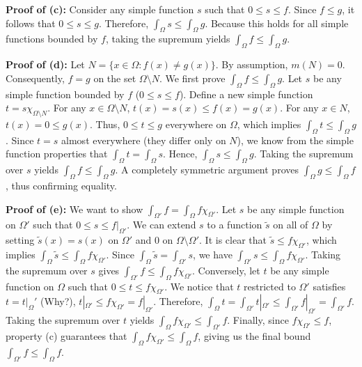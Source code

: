 \begin{pfbox}
    \textbf{Proof of (c):} Consider any simple function $s$ such that $0 \le s \le f$. Since $f \le g$, it follows that $0 \le s \le g$. Therefore, $\int_\Omega s \le \int_\Omega g$. Because this holds for all simple functions bounded by $f$, taking the supremum yields $\int_\Omega f \le \int_\Omega g$.

    \textbf{Proof of (d):} Let $N = \{x \in \Omega : f(x) \neq g(x)\}$. By assumption, $m(N) = 0$. Consequently, $f = g$ on the set $\Omega \setminus N$.
    We first prove $\int_\Omega f \le \int_\Omega g$. Let $s$ be any simple function bounded by $f$ ($0 \le s \le f$). Define a new simple function $t = s \chi_{\Omega \setminus N}$.
    For any $x \in \Omega \setminus N$, $t(x) = s(x) \le f(x) = g(x)$. For any $x \in N$, $t(x) = 0 \le g(x)$.
    Thus, $0 \le t \le g$ everywhere on $\Omega$, which implies $\int_\Omega t \le \int_\Omega g$. Since $t = s$ almost everywhere (they differ only on $N$), we know from the simple function properties that $\int_\Omega t = \int_\Omega s$. Hence, $\int_\Omega s \le \int_\Omega g$. Taking the supremum over $s$ yields $\int_\Omega f \le \int_\Omega g$.
    A completely symmetric argument proves $\int_\Omega g \le \int_\Omega f$, thus confirming equality.

    \textbf{Proof of (e):} We want to show $\int_{\Omega'} f = \int_\Omega f \chi_{\Omega'}$. Let $s$ be any simple function on $\Omega'$ such that $0 \le s \le f|_{\Omega'}$. We can extend $s$ to a function $\tilde{s}$ on all of $\Omega$ by setting $\tilde{s}(x) = s(x)$ on $\Omega'$ and $0$ on $\Omega \setminus \Omega'$.
    It is clear that $\tilde{s} \le f \chi_{\Omega'}$, which implies $\int_\Omega \tilde{s} \le \int_\Omega f \chi_{\Omega'}$. Since $\int_{\Omega} \tilde{s} = \int_{\Omega'} s$, we have $\int_{\Omega'} s \le \int_\Omega f \chi_{\Omega'}$. Taking the supremum over $s$ gives $\int_{\Omega'} f \le \int_\Omega f \chi_{\Omega'}$.
    Conversely, let $t$ be any simple function on $\Omega$ such that $0 \le t \le f \chi_{\Omega'}$. We notice that $t$ restricted to $\Omega'$ satisfies $t = t|_\Omega'$ (Why?), $t|_{\Omega'} \le f \chi_{\Omega'} = f|_{\Omega'}$. Therefore, $\int_\Omega t = \int_{\Omega'} t|_{\Omega'} \le \int_{\Omega'} f|_{\Omega'} = \int_{\Omega'} f$. Taking the supremum over $t$ yields $\int_\Omega f \chi_{\Omega'} \le \int_{\Omega'} f$.
    Finally, since $f \chi_{\Omega'} \le f$, property (c) guarantees that $\int_\Omega f \chi_{\Omega'} \le \int_\Omega f$, giving us the final bound $\int_{\Omega'} f \le \int_\Omega f$.
\end{pfbox}

